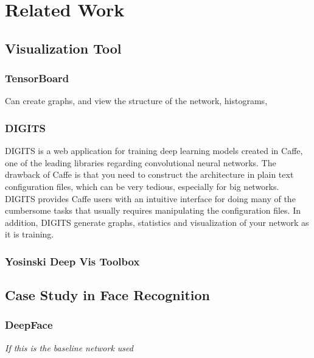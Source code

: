 
\chapter{Related Work}

\section{Visualization Tool}

\subsection{TensorBoard}

Can create graphs, and view the structure of the network, histograms, 

\subsection{DIGITS}

DIGITS is a web application for training deep learning models created in Caffe, one of the leading libraries regarding convolutional neural networks. The drawback of Caffe is that you need to construct the architecture in plain text configuration files, which can be very tedious, especially for big networks. DIGITS provides Caffe users with an intuitive interface for doing many of the cumbersome tasks that usually requires manipulating the configuration files. In addition, DIGITS generate graphs, statistics and visualization of your network as it is training.

\subsection{Yosinski Deep Vis Toolbox}

\section{Case Study in Face Recognition}

\subsection{DeepFace}

\textit{If this is the baseline network used}

\cleardoublepage